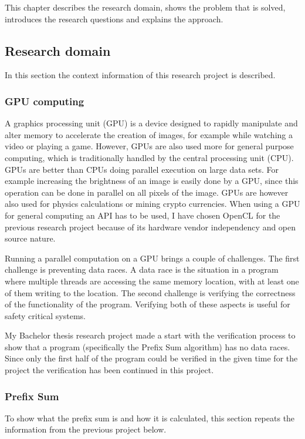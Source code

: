 \documentclass[a4paper]{article}
\begin{document}
This chapter describes the research domain, shows the problem that is solved, introduces the research questions and explains the approach.

\subsection{Research domain}
In this section the context information of this research project is described.

\subsubsection{GPU computing}
A graphics processing unit (GPU) is a device designed to rapidly manipulate and alter memory to accelerate the creation of images, for example while watching a video or playing a game. However, GPUs are also used more for general purpose computing, which is traditionally handled by the central processing unit (CPU). GPUs are better than CPUs doing parallel execution on large data sets. For example increasing the brightness of an image is easily done by a GPU, since this operation can be done in parallel on all pixels of the image. GPUs are however also used for physics calculations or mining crypto currencies. When using a GPU for general computing an API has to be used, I have chosen OpenCL for the previous research project because of its hardware vendor independency and open source nature. 

Running a parallel computation on a GPU brings a couple of challenges. The first challenge is preventing data races. A data race is the situation in a program where multiple threads are accessing the same memory location, with at least one of them writing to the location. The second challenge is verifying the correctness of the functionality of the program. Verifying both of these aspects is useful for safety critical systems.

My Bachelor thesis research project made a start with the verification process to show that a program (specifically the Prefix Sum algorithm) has no data races. Since only the first half of the program could be verified in the given time for the project the verification has been continued in this project.

\subsubsection{Prefix Sum}
To show what the prefix sum is and how it is calculated, this section repeats the information from the previous project\cite{bachelorThesis} below.
\end{document}
